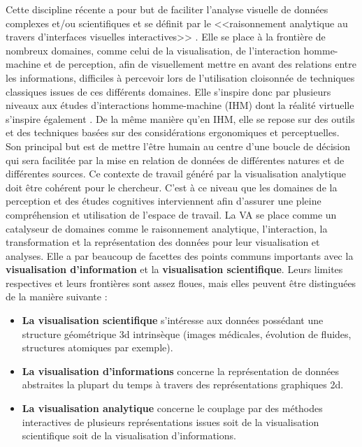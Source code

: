 Cette discipline récente a pour but de faciliter l'analyse visuelle de données complexes et/ou scientifiques et se définit par le <<raisonnement analytique au travers d'interfaces visuelles interactives>> \cite{cook_illuminating_2005}. Elle se place à la frontière de nombreux domaines, comme celui de la visualisation, de l'interaction homme-machine et de perception, afin de visuellement mettre en avant des relations entre les informations, difficiles à percevoir lors de l'utilisation cloisonnée de techniques classiques issues de ces différents domaines. %
Elle s'inspire donc par plusieurs niveaux aux études d'interactions homme-machine (IHM) dont la réalité virtuelle s'inspire également \cite{arias-hernandez_visual_2011}. De la même manière qu'en IHM, elle se repose sur des outils et des techniques basées sur des considérations ergonomiques et perceptuelles. Son principal but est de mettre l'être humain au centre d'une boucle de décision qui sera facilitée par la mise en relation de données de différentes natures et de différentes sources. Ce contexte de travail généré par la visualisation analytique doit être cohérent pour le chercheur. C'est à ce niveau que les domaines de la perception et des études cognitives interviennent afin d'assurer une pleine compréhension et utilisation de l'espace de travail. La VA se place comme un catalyseur de domaines comme le raisonnement analytique, l'interaction, la transformation et la représentation des données pour leur visualisation et analyses.
Elle a par beaucoup de facettes des points communs importants avec la \textbf{visualisation d'information} et la \textbf{visualisation scientifique}. Leurs limites respectives et leurs frontières sont assez floues, mais elles peuvent être distinguées de la manière suivante :

\begin{itemize}
  \item \textbf{La visualisation scientifique} s'intéresse aux données possédant une structure géométrique 3d intrinsèque (images médicales, évolution de fluides, structures atomiques par exemple).
  \item \textbf{La visualisation d'informations} concerne la représentation de données abstraites la plupart du temps à travers des représentations graphiques 2d.
  \item \textbf{La visualisation analytique} concerne le couplage par des méthodes interactives de plusieurs représentations issues soit de la visualisation scientifique soit de la visualisation d'informations.
\end{itemize}

